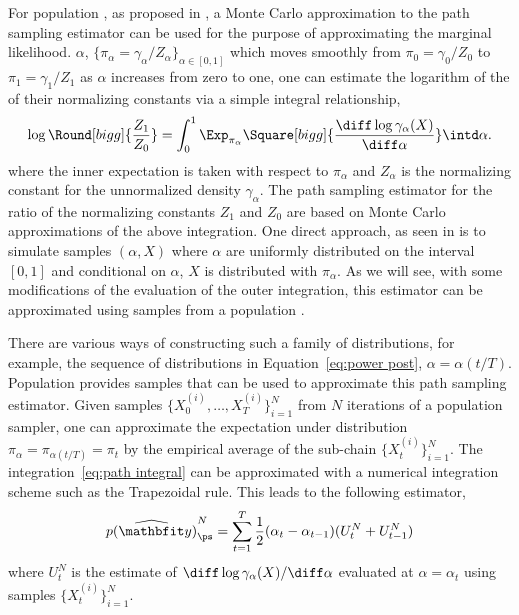 For population \mcmc, as proposed in \cite{Calderhead:2009bd}, a Monte Carlo approximation to the path sampling estimator \cite{Gelman:1998ei} can be used for the purpose of approximating the marginal likelihood.
 $\alpha$, $\{\pi_{\alpha} = \gamma_{\alpha}/Z_{\alpha}\}_{\alpha\in[0,1]}$ which moves smoothly from $\pi_0 = \gamma_0/Z_0$ to $\pi_1 = \gamma_1/Z_1$ as $\alpha$ increases from zero to one, one can estimate the logarithm of the  of their normalizing constants via a simple integral relationship,
\begin{equation}
  \log\Round[bigg]{\frac{Z_1}{Z_0}} = \int_0^1\Exp_{\pi_{\alpha}}
  \Square[bigg]{\frac{\diff\log\gamma_{\alpha}(X)}{\diff\alpha}}
  \intd\alpha.
  \label{eq:path integral}
\end{equation}
where the inner expectation is taken with respect to $\pi_{\alpha}$ and $Z_{\alpha}$ is the normalizing constant for the unnormalized density $\gamma_{\alpha}$. The path sampling estimator for the ratio of the normalizing constants $Z_1$ and $Z_0$ are based on Monte Carlo approximations of the above integration. One direct approach, as seen in \cite{Gelman:1998ei} is to simulate samples $(\alpha,X)$ where $\alpha$ are uniformly distributed on the interval $[0,1]$ and conditional on $\alpha$, $X$ is distributed with $\pi_{\alpha}$. As we will see, with some modifications of the evaluation of the outer integration, this estimator can be approximated using samples from a population \mcmc.

There are various ways of constructing such a family of distributions, for example, the sequence of distributions in Equation~\eqref{eq:power post}, $\alpha = \alpha(t/T)$. Population \mcmc provides samples that can be used to approximate this path sampling estimator. Given samples $\{X_0^{(i)},\dots,X_T^{(i)}\}_{i=1}^N$ from $N$ iterations of a population \mcmc sampler, one can approximate the expectation under distribution $\pi_{\alpha} = \pi_{\alpha(t/T)} = \pi_t$ by the empirical average of the sub-chain $\{X_t^{(i)}\}_{i=1}^N$. The integration~\eqref{eq:path integral} can be approximated with a numerical integration scheme such as the Trapezoidal rule. This leads to the following estimator,
\begin{equation}
  \widehat{p(\data)}_{\ps}^N = \sum_{t=1}^T
  \frac{1}{2}(\alpha_t - \alpha_{t-1})(U_t^N + U_{t-1}^N)
\end{equation}
where $U_t^N$ is the estimate of $\diff\log\gamma_{\alpha}(X)/\diff\alpha$ evaluated at $\alpha = \alpha_t$ using samples $\{X_t^{(i)}\}_{i=1}^N$.

